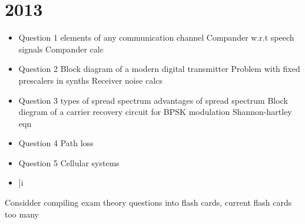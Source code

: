 \documentclass{article}
\begin{document}
\begin{multicols}{2}
\begin{itemize}
\end{itemize}
\section{2013}
\begin{itemize}
	\item Question 1
		 elements of any communication channel
		\subitem Compander w.r.t speech signals
		\subitem Compander calc
	\item Question 2
		\subitem Block diagram of a modern digital transmitter
		\subitem Problem with fixed prescalers in synths
		\subitem Receiver noise calcs
	\item Question 3
		 types of spread spectrum
		 advantages of spread spectrum
		\subitem Block diegram of a carrier recovery circuit for BPSK modulation
		\subitem Shannon-hartley eqn
	\item Question 4
		\subitem Path loss
	\item Question 5
		\subitem Cellular systems
	
\end{itemize}

\begin{itemize}
	\item 
	]i
\end{itemize}
\end{multicols}
Considder compiling exam theory questions into flash cards, current flash cards too many
\end{document}
